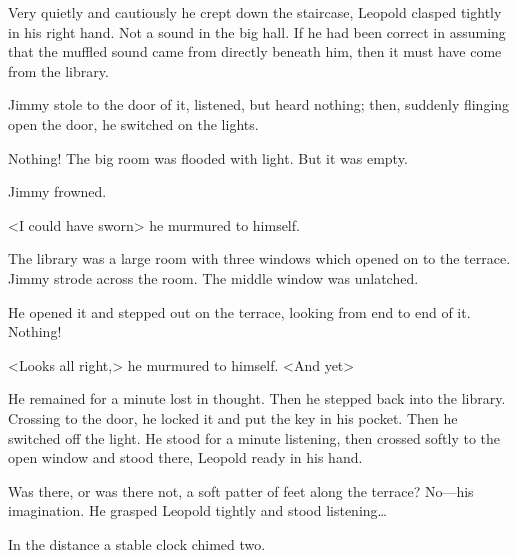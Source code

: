 Very quietly and cautiously he crept down the staircase, Leopold clasped tightly in his right hand. Not a sound in the big hall. If he had been correct in assuming that the muffled sound came from directly beneath him, then it must have come from the library.

Jimmy stole to the door of it, listened, but heard nothing; then, suddenly flinging open the door, he switched on the lights.

Nothing! The big room was flooded with light. But it was empty.

Jimmy frowned.

<I could have sworn\longdash> he murmured to himself.

The library was a large room with three windows which opened on to the terrace. Jimmy strode across the room. The middle window was unlatched.

He opened it and stepped out on the terrace, looking from end to end of it. Nothing!

<Looks all right,> he murmured to himself. <And yet\longdash>

He remained for a minute lost in thought. Then he stepped back into the library. Crossing to the door, he locked it and put the key in his pocket. Then he switched off the light. He stood for a minute listening, then crossed softly to the open window and stood there, Leopold ready in his hand.

Was there, or was there not, a soft patter of feet along the terrace? No—his imagination. He grasped Leopold tightly and stood listening\dots

In the distance a stable clock chimed two.